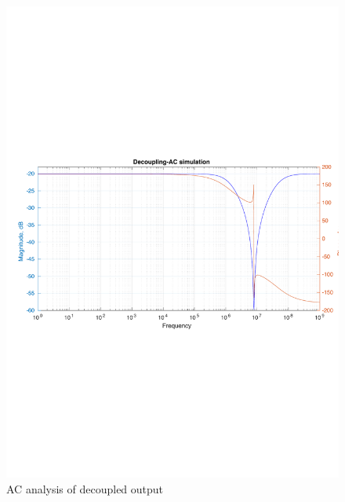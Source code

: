 \documentclass[12pt,a4paper,UKenglish]{article}
\begin{document}
\begin{figure} [H]
  \centering 
  \includegraphics[width=\textwidth]{img/3e_ac.pdf} 
  \caption{AC analysis of decoupled output}
  \label{cap_ac} 
\end{figure}

\end{document}
